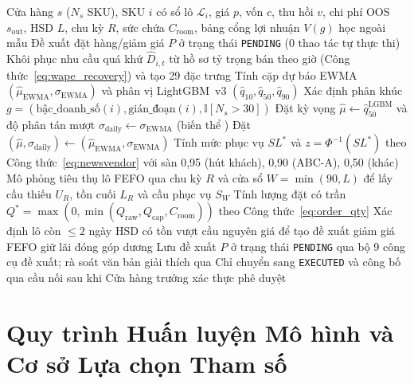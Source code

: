 \begin{algorithm}[htbp]
\caption{Đặt hàng Hàng Tươi sống Định tuyến Cổng Lợi nhuận (\texttt{B-Gate}), Trần FEFO \& HITL (\texttt{ops\_chest})}
\label{alg:ops_chest_newsvendor}
\footnotesize
\begin{algorithmic}[1]
\Require Cửa hàng $s$ ($N_s$ SKU), SKU $i$ có sổ lô $\mathcal{L}_i$, giá $p$, vốn $c$, thu hồi $v$, chi phí OOS $s_{\text{out}}$, HSD $L$, chu kỳ $R$, sức chứa $C_{\text{room}}$, bảng cổng lợi nhuận $V(g)$ học ngoài mẫu
\Ensure Đề xuất đặt hàng/giảm giá $P$ ở trạng thái \texttt{PENDING} (0 thao tác tự thực thi)
\State Khôi phục nhu cầu quá khứ $\hat{D}_{i,t}$ từ hồ sơ tỷ trọng bán theo giờ (Công thức~\ref{eq:wape_recovery}) và tạo 29 đặc trưng
\State Tính cặp dự báo EWMA $(\hat{\mu}_{\text{EWMA}}, \sigma_{\text{EWMA}})$ và phân vị LightGBM~v3 $(\hat{q}_{10}, \hat{q}_{50}, \hat{q}_{90})$
\State Xác định phân khúc $g = (\text{bậc\_doanh\_số}(i), \text{gián\_đoạn}(i), \mathbb{I}[N_s > 30])$
    \State Đặt kỳ vọng $\hat{\mu} \gets \hat{q}_{50}^{\text{LGBM}}$ và độ phân tán mượt $\sigma_{\text{daily}} \gets \sigma_{\text{EWMA}}$ (biến thể )
\Else
    \State Đặt $(\hat{\mu}, \sigma_{\text{daily}}) \gets (\hat{\mu}_{\text{EWMA}}, \sigma_{\text{EWMA}})$
\EndIf
\State Tính mức phục vụ $SL^*$ và $z = \Phi^{-1}(SL^*)$ theo Công thức~\ref{eq:newsvendor} với sàn 0,95 (hút khách), 0,90 (ABC-A), 0,50 (khác)
\State Mô phỏng tiêu thụ lô FEFO qua chu kỳ $R$ và cửa sổ $W = \min(90, L)$ để lấy cầu thiếu $U_R$, tồn cuối $L_R$ và cầu phục vụ $S_W$
\State Tính lượng đặt có trần $Q^* = \max(0, \min(Q_{\text{raw}}, Q_{\text{cap}}, C_{\text{room}}))$ theo Công thức~\ref{eq:order_qty}
\State Xác định lô còn $\le 2$ ngày HSD có tồn vượt cầu nguyên giá để tạo đề xuất giảm giá FEFO giữ lãi đóng góp dương
\State Lưu đề xuất $P$ ở trạng thái \texttt{PENDING} qua bộ 9 công cụ đề xuất; rà soát văn bản giải thích qua 
\State Chỉ chuyển sang \texttt{EXECUTED} và công bố qua cầu nối  sau khi Cửa hàng trưởng xác thực phê duyệt
\end{algorithmic}
\end{algorithm}

\section{Quy trình Huấn luyện Mô hình và Cơ sở Lựa chọn Tham số}

